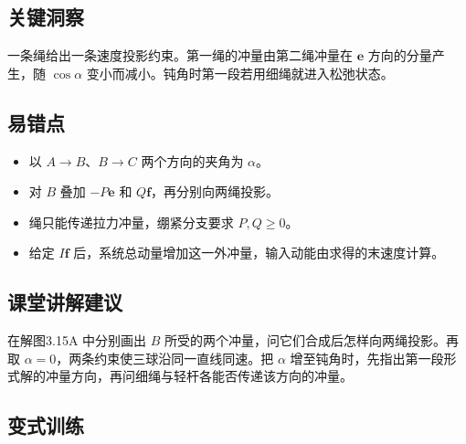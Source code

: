 \documentclass[UTF8,fontset=fandol,a4paper,11pt]{ctexart}
\newcommand{\vect}[1]{\bm{#1}}
\begin{document}


\subsection*{关键洞察}

一条绳给出一条速度投影约束。第一绳的冲量由第二绳冲量在 $\vect e$ 方向的分量产生，随 $\cos\alpha$ 变小而减小。钝角时第一段若用细绳就进入松弛状态。



\subsection*{易错点}

\begin{itemize}
\item 以 $A\to B$、$B\to C$ 两个方向的夹角为 $\alpha$。
\item 对 $B$ 叠加 $-P\vect e$ 和 $Q\vect f$，再分别向两绳投影。
\item 绳只能传递拉力冲量，绷紧分支要求 $P,Q\geq0$。
\item 给定 $I\vect f$ 后，系统总动量增加这一外冲量，输入动能由求得的末速度计算。
\end{itemize}



\subsection*{课堂讲解建议}

在解图3.15A 中分别画出 $B$ 所受的两个冲量，问它们合成后怎样向两绳投影。再取 $\alpha=0$，两条约束使三球沿同一直线同速。把 $\alpha$ 增至钝角时，先指出第一段形式解的冲量方向，再问细绳与轻杆各能否传递该方向的冲量。



\subsection*{变式训练}
\end{document}
